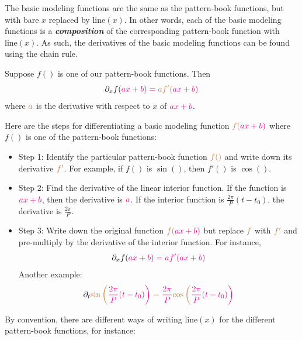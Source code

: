 \documentclass[
  letterpaper,
  DIV=11,
  numbers=noendperiod,
  oneside]{scrreprt}
\providecommand{\tightlist}{%
  \setlength{\itemsep}{0pt}\setlength{\parskip}{0pt}}
\renewcommand{\line}{\text{line}}
\begin{document}
The basic modeling functions are the same as the pattern-book functions,
but with bare \(x\) replaced by \(\line(x)\). In other words, each of
the basic modeling functions is a \textbf{\emph{composition}} of the
corresponding pattern-book function with \(\line(x)\). As such, the
derivatives of the basic modeling functions can be found using the chain
rule.

Suppose \(f()\) is one of our pattern-book functions. Then
\[\large\partial_x f(\color{magenta}{ax + b}) = \color{brown}{a} f'(\color{magenta}{ax + b})\]
where \(\color{brown}{a}\) is the derivative with respect to \(x\) of
\(\color{magenta}{ax + b}\).

Here are the steps for differentiating a basic modeling function
\(\color{brown}{f}(\color{magenta}{a x + b})\) where \(f()\) is one of
the pattern-book functions:

\begin{itemize}
\tightlist
\item
  Step 1: Identify the particular pattern-book function
  \(\color{brown}{f}()\) and write down its derivative
  \(\color{brown}{f'}\). For example, if \(f()\) is \(\sin()\), then
  \(f'()\) is \(\cos()\).
\item
  Step 2: Find the derivative of the linear interior function. If the
  function is \(\color{magenta}{ax + b}\), then the derivative is
  \(\color{magenta}{a}\). If the interior function is
  \(\frac{2\pi}{P}(t-t_0)\), the derivative is \(\frac{2 \pi}{P}\).
\item
  Step 3: Write down the original function
  \(\large\color{brown}{f}(\color{magenta}{a x + b})\) but replace
  \(\large\color{brown}{f}\) with \(\large \color{brown}{f'}\) and
  pre-multiply by the derivative of the interior function. For instance,
  \[\partial_x f(\color{magenta}{ax + b}) = {\large \color{magenta}{a}}{\large f'}(\color{magenta}{ax + b})\]
  Another example:
  \[\partial_t \color{brown}{\sin}\left(\color{magenta}{\frac{2 \pi}{P}(t-t_0)} \right) = {\large \color{magenta}{\frac{2 \pi}{P}}}\color{brown}{\large\cos}\left(\color{magenta}{\frac{2 \pi}{P}(t-t_0) }\right) \]
\end{itemize}

By convention, there are different ways of writing \(\line(x)\) for the
different pattern-book functions, for instance:
\end{document}
